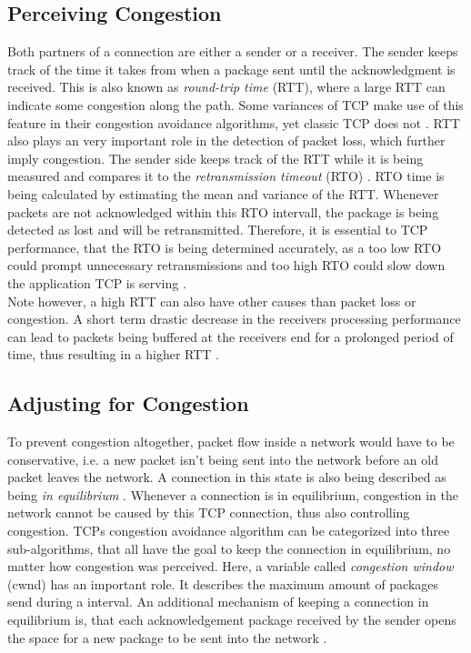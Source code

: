 \documentclass[a4paper,conference]{IEEEtran}
\begin{document}
\subsection{Perceiving Congestion}
Both partners of a connection are either a sender or a receiver. The sender keeps track of the time it takes from when a package sent until the acknowledgment is received. This is also known as \textit{round-trip time} (RTT), where a large RTT can indicate some congestion along the path. Some variances of TCP make use of this feature in their congestion avoidance algorithms, yet classic TCP does not \cite{huston2000tcp,jacobson1995congestion}. RTT also plays an very important role in the detection of packet loss, which further imply congestion. The sender side keeps track of the RTT while it is being measured and compares it to the \textit{retransmission timeout} (RTO) \cite{jacobson1992tcp}. RTO time is being calculated by estimating the mean and variance of the RTT. Whenever 	packets are not acknowledged within this RTO intervall, the package is being detected as lost and will be retransmitted. Therefore, it is essential to TCP performance, that the RTO is being determined accurately, as a too low RTO could prompt unnecessary retransmissions and too high RTO could slow down the application TCP is serving \cite{huston2000tcp,jacobson1995congestion}.\\
Note however, a high RTT can also have other causes than packet loss or congestion. A short term drastic decrease in the receivers processing performance can lead to packets being buffered at the receivers end for a prolonged period of time, thus resulting in a higher RTT \cite{huston2000tcp}.

\subsection{Adjusting for Congestion}
To prevent congestion altogether, packet flow inside a network would have to be conservative, i.e. a new packet isn't being sent into the network before an old packet leaves the network. A connection in this state is also being described as being \textit{in equilibrium} \cite{jacobson1992tcp}. Whenever a connection is in equilibrium, congestion in the network cannot be caused by this TCP connection, thus also controlling congestion. TCPs congestion avoidance algorithm can be categorized into three sub-algorithms, that all have the goal to keep the connection in equilibrium, no matter how congestion was perceived. Here, a variable called \textit{congestion window} (cwnd) has an important role. It describes the maximum amount of packages send during a interval. An additional mechanism of keeping a connection in equilibrium is, that each acknowledgement package received by the sender opens the space for a new package to be sent into the network \cite{jacobson1992tcp}.
\end{document}
